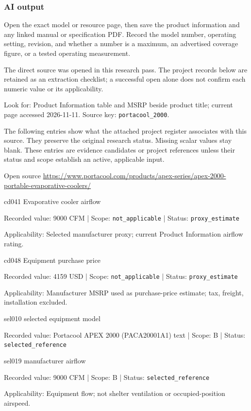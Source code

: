 \subsubsection*{AI output}
Open the exact model or resource page, then save the product information and any linked manual or specification PDF. Record the model number, operating setting, revision, and whether a number is a maximum, an advertised coverage figure, or a tested operating measurement.

The direct source was opened in this research pass. The project records below are retained as an extraction checklist; a successful open alone does not confirm each numeric value or its applicability.

Look for: Product Information table and MSRP beside product title; current page accessed 2026-11-11. Source key: \nolinkurl{portacool_2000}.

The following entries show what the attached project register associates with this source. They preserve the original research status. Missing scalar values stay blank. These entries are evidence candidates or project references unless their status and scope establish an active, applicable input.

Open source  \url{https://www.portacool.com/products/apex-series/apex-2000-portable-evaporative-coolers/}

cd041  Evaporative cooler airflow

Recorded value: 9000 CFM | Scope: \nolinkurl{not_applicable} | Status: \nolinkurl{proxy_estimate}

Applicability: Selected manufacturer proxy; current Product Information airflow rating.

cd048  Equipment purchase price

Recorded value: 4159 USD | Scope: \nolinkurl{not_applicable} | Status: \nolinkurl{proxy_estimate}

Applicability: Manufacturer MSRP used as purchase-price estimate; tax, freight, installation excluded.

sel010  selected equipment model

Recorded value: Portacool APEX 2000 (PACA20001A1) text | Scope: B | Status: \nolinkurl{selected_reference}

sel019  manufacturer airflow

Recorded value: 9000 CFM | Scope: B | Status: \nolinkurl{selected_reference}

Applicability: Equipment flow; not shelter ventilation or occupied-position airspeed.

